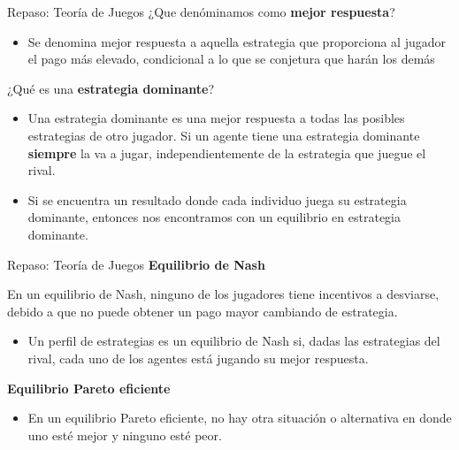 \documentclass{beamer}
\begin{document}
\begin{frame}{Repaso: Teoría de Juegos}
    ¿Que denóminamos como \textbf{mejor respuesta}? \pause
    \begin{itemize}
        \item  Se denomina mejor respuesta a aquella estrategia que proporciona al jugador el pago más elevado, condicional a lo que se conjetura que harán los demás
    \end{itemize} \pause
    \vspace{2mm}
    ¿Qué es una \textbf{estrategia dominante}? \pause
    \begin{itemize}
        \item Una estrategia dominante es una mejor respuesta a todas las posibles estrategias de otro jugador. Si un agente tiene una estrategia dominante \textbf{siempre} la va a jugar, independientemente de la estrategia que juegue el rival.
        \item Si se encuentra un resultado donde cada individuo juega su estrategia dominante, entonces nos encontramos con un equilibrio en estrategia dominante.
        \end{itemize}
\end{frame}

\begin{frame}{Repaso: Teoría de Juegos}
\textbf{Equilibrio de Nash}
    \begin{boxB}
        \centering
        En un equilibrio de Nash, ninguno de los jugadores tiene incentivos a desviarse, debido a que no puede obtener un pago mayor cambiando de estrategia.
    \end{boxB}
    \begin{itemize}
        \item  Un perfil de estrategias es un equilibrio de Nash si, dadas las estrategias del rival, cada uno de los agentes está jugando su mejor respuesta.
    \end{itemize}
    \textbf{Equilibrio Pareto eficiente}
        \begin{itemize}
        \item   En un equilibrio Pareto eficiente, no hay otra situación o alternativa en donde uno esté mejor y ninguno esté peor. 
    \end{itemize}
\end{frame}
\end{document}
